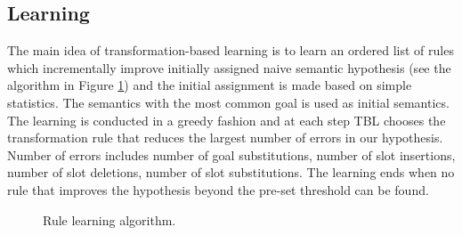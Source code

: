 \documentclass{article}
\begin{document}
\subsection{Learning} \label{sec:tbl:learning}
The main idea of transformation-based learning is to learn an ordered list of rules which incrementally improve initially assigned naive semantic hypothesis (see the algorithm in Figure \ref{alg:tbl:learning}) and the initial assignment is made based on simple statistics. The semantics with the most common goal is used as initial semantics. The learning is conducted in a greedy fashion and at each step TBL chooses the transformation rule that reduces the largest number of errors in our hypothesis. Number of errors includes number of goal substitutions, number of slot insertions, number of slot deletions, number of slot substitutions. The learning ends when no rule that improves the hypothesis beyond the pre-set threshold can be found.


\begin{figure}
\caption{Rule learning algorithm.}
\label{alg:tbl:learning}
\end{figure} 
\end{document}
